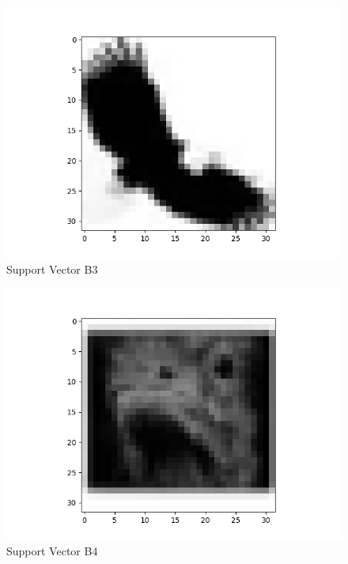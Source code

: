 \documentclass[11pt]{article}
\begin{document}
\begin{figure}[H]
\begin{center}
  \includegraphics[scale=0.45]{b3.png}
  \caption{Support Vector B3}
  \label{fig3C}
\end{center}
\end{figure}
\begin{figure}[H]
\begin{center}
  \includegraphics[scale=0.45]{b4.png}
  \caption{Support Vector B4}
  \label{fig3D}
\end{center}
\end{figure}
\end{document}
